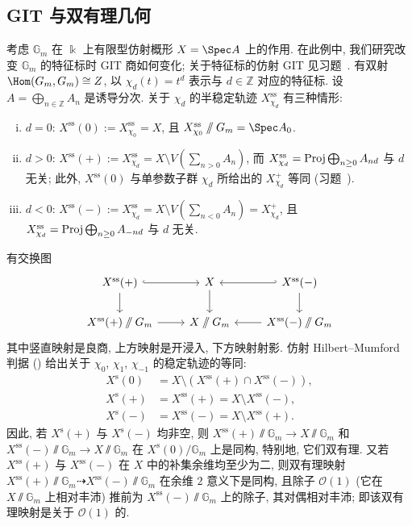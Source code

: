 \subsection{GIT 与双有理几何}\label{src:8.5.4-subsection}
\begin{example}\label{src:8.5.8}
考虑 $\mathbb G_m$ 在 $\Bbbk$ 上有限型仿射概形 $X=\Spec A$ 上的作用. 在此例中, 我们研究改变 $\mathbb G_m$ 的特征标时 GIT 商如何变化; 关于特征标的仿射 GIT 见习题~. 有双射 $\Hom(\mathbb G_m,\mathbb G_m)\cong\mathbb Z$, 以 $\chi_d(t)=t^d$ 表示与 $d\in\mathbb Z$ 对应的特征标. 设 $A=\bigoplus_{n\in\mathbb Z}A_n$ 是诱导分次. 关于 $\chi_d$ 的半稳定轨迹 $X_{\chi_d}^{\mathrm{ss}}$ 有三种情形:
\begin{enumerate}[(i)]
\item $d=0$: $X^{\mathrm{ss}}(0):=X_{\chi_0}^{\mathrm{ss}}=X$, 且 $X_{\chi_0}^{\mathrm{ss}}\sslash\mathbb G_m=\Spec A_0$.
\item $d>0$: $X^{\mathrm{ss}}(+):=X_{\chi_d}^{\mathrm{ss}}=X\setminus V(\sum_{n>0}A_n)$, 而 $X_{\chi_d}^{\mathrm{ss}}=\operatorname{Proj}\bigoplus_{n\geq0}A_{nd}$ 与 $d$ 无关; 此外, $X^{\mathrm{ss}}(0)$ 与单参数子群 $\chi_d$ 所给出的 $X_{\chi_d}^+$ 等同 (习题~).
\item $d<0$: $X^{\mathrm{ss}}(-):=X_{\chi_d}^{\mathrm{ss}}=X\setminus V(\sum_{n<0}A_n)=X_{\chi_d}^+$, 且 $X_{\chi_d}^{\mathrm{ss}}=\operatorname{Proj}\bigoplus_{n\geq0}A_{-nd}$ 与 $d$ 无关.
\end{enumerate}
有交换图
\[
\begin{tikzcd}[ampersand replacement=\&]
X^{\mathrm{ss}}(+)\arrow[r,hook]\arrow[d]\&X\arrow[d]\&X^{\mathrm{ss}}(-)\arrow[l,hook']\arrow[d]\\
{X^{\mathrm{ss}}(+)\sslash\mathbb G_m}\arrow[r]\&{X\sslash\mathbb G_m}\&{X^{\mathrm{ss}}(-)\sslash\mathbb G_m}\arrow[l]
\end{tikzcd}
\]
其中竖直映射是良商, 上方映射是开浸入, 下方映射射影. 仿射 Hilbert--Mumford 判据 () 给出关于 $\chi_0$, $\chi_1$, $\chi_{-1}$ 的稳定轨迹的等同:
\begin{align*}
X^{\mathrm s}(0)&=X\setminus(X^{\mathrm{ss}}(+)\cap X^{\mathrm{ss}}(-)),\\
X^{\mathrm s}(+)&=X^{\mathrm{ss}}(+)=X\setminus X^{\mathrm{ss}}(-),\\
X^{\mathrm s}(-)&=X^{\mathrm{ss}}(-)=X\setminus X^{\mathrm{ss}}(+).
\end{align*}
因此, 若 $X^{\mathrm s}(+)$ 与 $X^{\mathrm s}(-)$ 均非空, 则 $X^{\mathrm{ss}}(+)\sslash\mathbb G_m\to X\sslash\mathbb G_m$ 和 $X^{\mathrm{ss}}(-)\sslash\mathbb G_m\to X\sslash\mathbb G_m$ 在 $X^{\mathrm s}(0)/\mathbb G_m$ 上是同构, 特别地, 它们双有理. 又若 $X^{\mathrm{ss}}(+)$ 与 $X^{\mathrm{ss}}(-)$ 在 $X$ 中的补集余维均至少为二, 则双有理映射 $X^{\mathrm{ss}}(+)\sslash\mathbb G_m\dashrightarrow X^{\mathrm{ss}}(-)\sslash\mathbb G_m$ 在余维 $2$ 意义下是同构, 且除子 $\mathcal O(1)$ (它在 $X\sslash\mathbb G_m$ 上相对丰沛) 推前为 $X^{\mathrm{ss}}(-)\sslash\mathbb G_m$ 上的除子, 其对偶相对丰沛; 即该双有理映射是关于 $\mathcal O(1)$ 的.
\end{example}
